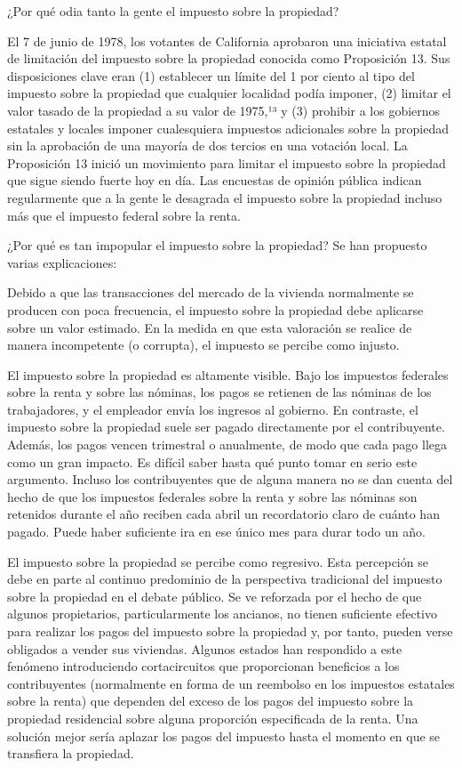 \documentclass[10pt,a4paper]{article}
\begin{document}
¿Por qué odia tanto la gente el impuesto sobre la propiedad?

El 7 de junio de 1978, los votantes de California aprobaron una iniciativa estatal de limitación del impuesto sobre la propiedad conocida como Proposición 13. Sus disposiciones clave eran (1) establecer un límite del 1 por ciento al tipo del impuesto sobre la propiedad que cualquier localidad podía imponer, (2) limitar el valor tasado de la propiedad a su valor de 1975,¹³ y (3) prohibir a los gobiernos estatales y locales imponer cualesquiera impuestos adicionales sobre la propiedad sin la aprobación de una mayoría de dos tercios en una votación local. La Proposición 13 inició un movimiento para limitar el impuesto sobre la propiedad que sigue siendo fuerte hoy en día. Las encuestas de opinión pública indican regularmente que a la gente le desagrada el impuesto sobre la propiedad incluso más que el impuesto federal sobre la renta.

¿Por qué es tan impopular el impuesto sobre la propiedad? Se han propuesto varias explicaciones:

Debido a que las transacciones del mercado de la vivienda normalmente se producen con poca frecuencia, el impuesto sobre la propiedad debe aplicarse sobre un valor estimado. En la medida en que esta valoración se realice de manera incompetente (o corrupta), el impuesto se percibe como injusto.

El impuesto sobre la propiedad es altamente visible. Bajo los impuestos federales sobre la renta y sobre las nóminas, los pagos se retienen de las nóminas de los trabajadores, y el empleador envía los ingresos al gobierno. En contraste, el impuesto sobre la propiedad suele ser pagado directamente por el contribuyente. Además, los pagos vencen trimestral o anualmente, de modo que cada pago llega como un gran impacto. Es difícil saber hasta qué punto tomar en serio este argumento. Incluso los contribuyentes que de alguna manera no se dan cuenta del hecho de que los impuestos federales sobre la renta y sobre las nóminas son retenidos durante el año reciben cada abril un recordatorio claro de cuánto han pagado. Puede haber suficiente ira en ese único mes para durar todo un año.

El impuesto sobre la propiedad se percibe como regresivo. 
Esta percepción se debe en parte al continuo predominio de la perspectiva tradicional del impuesto sobre la propiedad en el debate público. Se ve reforzada por el hecho de que algunos propietarios, particularmente los ancianos, no tienen suficiente efectivo para realizar los pagos del impuesto sobre la propiedad y, por tanto, pueden verse obligados a vender sus viviendas. Algunos estados han respondido a este fenómeno introduciendo cortacircuitos que proporcionan beneficios a los contribuyentes (normalmente en forma de un reembolso en los impuestos estatales sobre la renta) que dependen del exceso de los pagos del impuesto sobre la propiedad residencial sobre alguna proporción especificada de la renta. Una solución mejor sería aplazar los pagos del impuesto hasta el momento en que se transfiera la propiedad.
\end{document}
